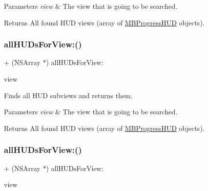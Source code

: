 \begin{DoxyParams}{Parameters}
{\em view} & The view that is going to be searched. \\
\hline
\end{DoxyParams}
\begin{DoxyReturn}{Returns}
All found H\+UD views (array of \mbox{\hyperlink{interface_m_b_progress_h_u_d}{M\+B\+Progress\+H\+UD}} objects). 
\end{DoxyReturn}
\mbox{\label{interface_m_b_progress_h_u_d_aaa8882a53b5edfd617b4ba112c60811b}} 
\subsubsection{\texorpdfstring{all\+H\+U\+Ds\+For\+View\+:()}{allHUDsForView:()}\hspace{0.1cm}{\footnotesize\ttfamily [2/3]}}
{\footnotesize\ttfamily + (N\+S\+Array $\ast$) all\+H\+U\+Ds\+For\+View\+: \begin{DoxyParamCaption}\item[{(U\+I\+View $\ast$)}]{view }\end{DoxyParamCaption}}

Finds all H\+UD subviews and returns them.


\begin{DoxyParams}{Parameters}
{\em view} & The view that is going to be searched. \\
\hline
\end{DoxyParams}
\begin{DoxyReturn}{Returns}
All found H\+UD views (array of \mbox{\hyperlink{interface_m_b_progress_h_u_d}{M\+B\+Progress\+H\+UD}} objects). 
\end{DoxyReturn}
\mbox{\label{interface_m_b_progress_h_u_d_aaa8882a53b5edfd617b4ba112c60811b}} 
\subsubsection{\texorpdfstring{all\+H\+U\+Ds\+For\+View\+:()}{allHUDsForView:()}\hspace{0.1cm}{\footnotesize\ttfamily [3/3]}}
{\footnotesize\ttfamily + (N\+S\+Array $\ast$) all\+H\+U\+Ds\+For\+View\+: \begin{DoxyParamCaption}\item[{(U\+I\+View $\ast$)}]{view }\end{DoxyParamCaption}}

